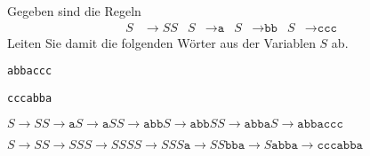 Gegeben sind die Regeln
\begin{align*}
S&\to SS
&
S&\to \texttt{a}
&
S&\to \texttt{bb}
&
S&\to \texttt{ccc}
\end{align*}
Leiten Sie damit die folgenden Wörter aus der Variablen $S$ ab.
\begin{teilaufgaben}
\item \texttt{abbaccc}
\item \texttt{cccabba}
\end{teilaufgaben}

\begin{loesung}
\begin{teilaufgaben}
\item
\(
S
\to
SS
\to
\texttt{a}S 
\to
\texttt{a}SS
\to
\texttt{abb}S
\to
\texttt{abb}SS
\to
\texttt{abba}S
\to
\texttt{abbaccc}
\)
\item
\(
S\to SS \to SSS \to SSSS
\to
SSS\texttt{a}
\to
SS\texttt{bba}
\to
S\texttt{abba}
\to
\texttt{cccabba}
\)
\qedhere
\end{teilaufgaben}
\end{loesung}
